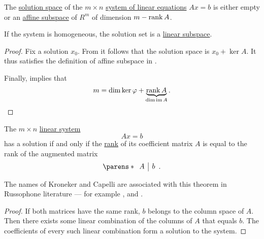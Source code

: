 \begin{corollary}\label{thm:linear_system_solution_space}
  The \hyperref[def:system_of_linear_equations/solution_space]{solution space} of the \( m \times n \) \hyperref[def:system_of_linear_equations]{system of linear equations} \( Ax = b \) is either empty or an \hyperref[def:affine_subspace]{affine subspace} of \( R^m \) of dimension \( m - \operatorname{rank} A \).

  If the system is homogeneous, the solution set is a \hyperref[def:module/submodel]{linear subspace}.
\end{corollary}
\begin{proof}
  Fix a solution \( x_0 \). From  it follows that the solution space is \( x_0 + \ker A \). It thus satisfies the definition of affine subspace in .

  Finally,  implies that
  \begin{equation*}
    m = \dim \ker \varphi + \underbrace{ \operatorname{rank} A }_{ \dim \operatorname{im} A }.
  \end{equation*}
\end{proof}

\begin{theorem}\label{thm:kroneker_capelli}
  The \( m \times n \) \hyperref[def:system_of_linear_equations]{linear system}
  \begin{equation*}
    Ax = b
  \end{equation*}
  has a solution if and only if the \hyperref[def:rank_and_nullity]{rank} of its coefficient matrix \( A \) is equal to the rank of the augmented matrix
  \begin{equation*}
    \parens*
    {
      \begin{array}{c|c}
        A & b
      \end{array}
    }.
  \end{equation*}
\end{theorem}
\begin{comments}
  \item The names of Kroneker and Capelli are associated with this theorem in Russophone literature --- for example ,  and .
\end{comments}
\begin{proof}
  If both matrices have the same rank, \( b \) belongs to the column space of \( A \). Then there exists some linear combination of the columns of \( A \) that equals \( b \). The coefficients of every such linear combination form a solution to the system.
\end{proof}
